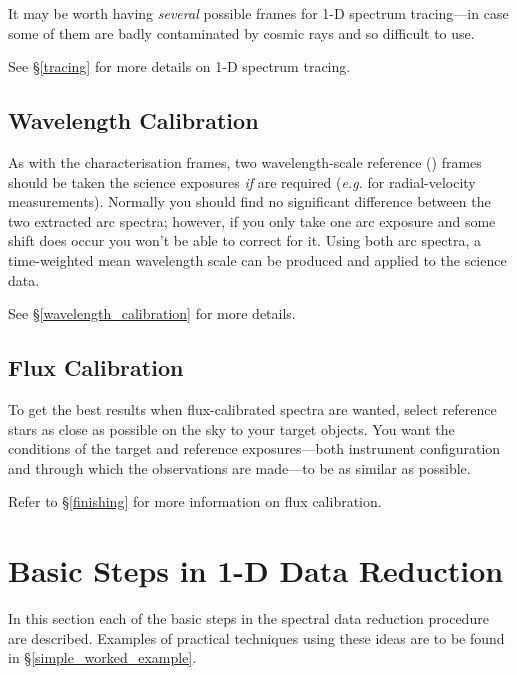\documentclass[twoside,11pt]{starlink}
\providecommand{\mlabel}[1]{\xlabel{#1}\label{#1}}
\providecommand{\scspec}[2]{#1}
\begin{document}
It may be worth having \emph{several} possible frames for
1-D spectrum tracing\scspec{---}{ - }in case some of them are badly
contaminated by cosmic rays and so difficult to use.

See \scspec{\S\ref{tracing}}{\htmlref{Tracing}{tracing}}
for more details on 1-D spectrum tracing.


\subsection{Wavelength Calibration}

As with the  characterisation frames, two
wavelength-scale reference () frames should be
taken  the science exposures
\emph{if}  are required
({\it{e.g.}} for radial-velocity measurements)\@.
Normally you should find no significant difference between the two
extracted arc spectra; however, if you only take one arc exposure and
some shift does occur you won't be able to correct for it.
Using both arc spectra, a time-weighted mean wavelength scale can be
produced and applied to the science data.

See \scspec{\S\ref{wavelength_calibration}}
{\htmlref{Wavelength Calibration}{wavelength_calibration}}
for more details.

\subsection{Flux Calibration}

To get the best results when flux-calibrated spectra are wanted, select
reference stars as close as possible on the sky to your target objects.
You want the conditions of the target and reference
exposures\scspec{---}{ - }both instrument configuration and
through which the observations are made\scspec{---}{ - }to be as
similar as possible.

Refer to \scspec{\S\ref{finishing}}{\htmlref{{\sl{Finishing}}}{finishing}}
for more information on flux calibration.


\section{\mlabel{basic_reduction_steps}Basic Steps in 1-D Data Reduction}


In this section each of the basic steps in the spectral data reduction
procedure are described.
Examples of practical techniques using these ideas are to be found
in \scspec{\S\ref{simple_worked_example}}
{\htmlref{A 1-D Worked Example}{simple_worked_example}}.
\end{document}
